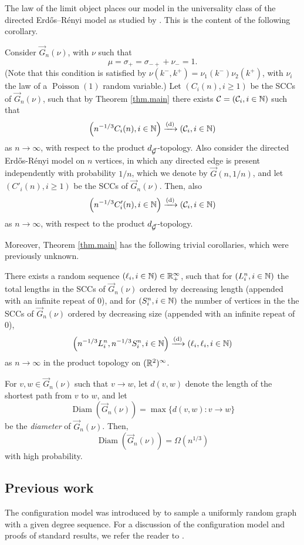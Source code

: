 The law of the limit object places our model in the universality class of the directed Erd\H{o}s--Rényi model as studied by \citet{goldschmidtScalingLimitCritical2019}. This is the content of the following corollary.
\begin{corollary}
Consider $\vec{G}_n(\nu)$, with $\nu$ such that $$\mu=\sigma_+=\sigma_{-+}+\nu_-=1.$$ (Note that this condition is satisfied by $\nu(k^-,k^+)=\nu_1(k^-)\nu_2(k^+)$, with $\nu_i$ the law of a $\operatorname{Poisson}(1)$ random variable.)
Let $(C_i(n), i\geq 1)$ be the SCCs of $\vec{G}_n(\nu)$, such that by Theorem \ref{thm.main} there exists ${\mathcal C}=({\mathcal C}_i,i\in {\mathbb N})$ such that 
$$\left(n^{-1/3}C_i(n),i\in {\mathbb N}\right)\xrightarrow[]{\mathrm{(d)}}\left({\mathcal C}_i,i\in {\mathbb N}\right)$$
as $n\to \infty$, with respect to the product $d_{\vec{{\mathcal G}}}$-topology. Also consider the directed Erd\H{o}s-R\'enyi model on $n$ vertices, in which any directed edge is present independently with probability $1/n$, which we denote by $\vec{G}(n,1/n)$, and let $(C'_i(n), i\geq 1)$ be the SCCs of $\vec{G}_n(\nu)$. Then, also
$$\left(n^{-1/3}C'_i(n),i\in {\mathbb N}\right)\xrightarrow[]{\mathrm{(d)}}\left({\mathcal C}_i,i\in {\mathbb N}\right)$$
as $n\to \infty$, with respect to the product $d_{\vec{{\mathcal G}}}$-topology. 
\end{corollary}
Moreover, Theorem \ref{thm.main} has the following trivial corollaries, which were previously unknown. 
\begin{corollary}
There exists a random sequence $(\ell_i,i\in {\mathbb N})\in {\mathbb R}_+^\infty$, such that for $(L^n_i,i\in {\mathbb N})$ the total lengths in the SCCs of $\vec{G}_n(\nu)$ ordered by decreasing length (appended with an infinite repeat of $0$), and for $(S^n_i,i\in{\mathbb N})$ the number of vertices in the the SCCs of $\vec{G}_n(\nu)$ ordered by decreasing size (appended with an infinite repeat of $0$),
$$\left(n^{-1/3}L^n_i,n^{-1/3}S^n_i, i\in {\mathbb N}\right)\xrightarrow[]{\mathrm{(d)}}\left(\ell_i,\ell_i,i\in {\mathbb N}\right)$$
as $n\to \infty$ in the product topology on $({\mathbb R}^2)^\infty$. 
\end{corollary}
\begin{corollary}
For $v,w\in \vec{G}_n(\nu)$ such that $v\to w$, let $d(v,w)$ denote the length of the shortest path from $v$ to $w$, and let $$\operatorname{Diam}\left(\vec{G}_n(\nu)\right)=\max\{d(v,w):v\to w\}$$ be the \emph{diameter} of $\vec{G}_n(\nu)$. Then,  $$\operatorname{Diam}\left(\vec{G}_n(\nu)\right)=\Omega(n^{1/3})$$
with high probability.
\end{corollary}


\subsection{Previous work}\label{sec.previouswork}
The configuration model was introduced by \citet{Bollobas1980} to sample a uniformly random graph with a given degree sequence. For a discussion of the configuration model and proofs of standard results, we refer the reader to \cite[Chapter 7]{hofstadRandomGraphsComplex2017}.

